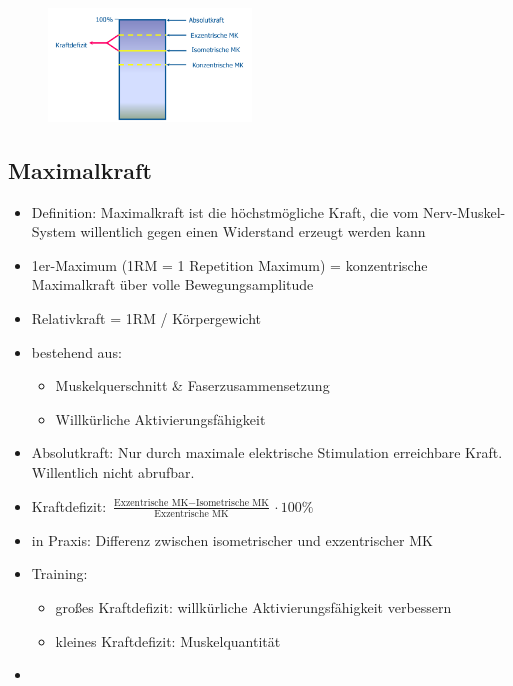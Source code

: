 \begin{figure}
  \begin{center}
    \includegraphics[width=0.48\textwidth]{pictures/maximalkraftvarianten}
  \end{center}
\end{figure}

\subsection{Maximalkraft}

\begin{itemize}
    \item Definition: Maximalkraft ist die höchstmögliche Kraft, die vom Nerv-Muskel-System willentlich gegen einen Widerstand erzeugt werden kann
    \item 1er-Maximum (1RM = 1 Repetition Maximum) = konzentrische Maximalkraft über volle Bewegungsamplitude
    \item Relativkraft = 1RM / Körpergewicht
    \item bestehend aus:
    \begin{itemize}
        \item Muskelquerschnitt \& Faserzusammensetzung
        \item Willkürliche Aktivierungsfähigkeit
    \end{itemize}
    \item Absolutkraft: Nur durch maximale elektrische Stimulation erreichbare Kraft. Willentlich nicht abrufbar.
    \item Kraftdefizit: $\frac{\text{Exzentrische MK} - \text{Isometrische MK}}{\text{Exzentrische MK}} \cdot 100 \%$
    \item in Praxis: Differenz zwischen isometrischer und exzentrischer MK
    \item Training:
    \begin{itemize}
        \item großes Kraftdefizit: willkürliche Aktivierungsfähigkeit verbessern
        \item kleines Kraftdefizit: Muskelquantität
    \end{itemize}
    \item
\end{itemize}

